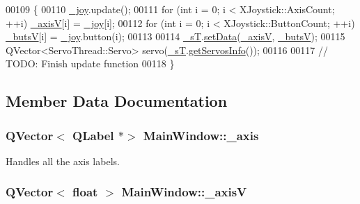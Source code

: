 \begin{DoxyCode}
00109 \{
00110     \hyperlink{a00004_a671f35800890e518713e1946671d8730}{\_joy}.update();
00111     \textcolor{keywordflow}{for} (\textcolor{keywordtype}{int} i = 0; i < XJoystick::AxisCount; ++i) \hyperlink{a00004_a20f66f574ed4c96d8dfc0013e1095f15}{\_axisV}[i] = \hyperlink{a00004_a671f35800890e518713e1946671d8730}{\_joy}[i];
00112     \textcolor{keywordflow}{for} (\textcolor{keywordtype}{int} i = 0; i < XJoystick::ButtonCount; ++i) \hyperlink{a00004_a519ae4630572cb63fbd04bce12fe8e77}{\_butsV}[i] = \hyperlink{a00004_a671f35800890e518713e1946671d8730}{\_joy}.button(i);
00113     
00114     \hyperlink{a00004_a97f8ecc7ecb930b796178cef7b975013}{\_sT}.\hyperlink{a00007_a8497ea56991b620981ce1fbf53d9ebdb}{setData}(\hyperlink{a00004_a20f66f574ed4c96d8dfc0013e1095f15}{\_axisV}, \hyperlink{a00004_a519ae4630572cb63fbd04bce12fe8e77}{\_butsV});
00115     QVector<ServoThread::Servo> servo(\hyperlink{a00004_a97f8ecc7ecb930b796178cef7b975013}{\_sT}.\hyperlink{a00007_a5fd8ef13314428f5ba7646730cc58f1c}{getServosInfo}());
00116     
00117     \textcolor{comment}{// TODO: Finish update function}
00118 \}
\end{DoxyCode}


\subsection{Member Data Documentation}
\hypertarget{a00004_a30c99d7a544f74b0650758e5cc7ead5a}{}
\subsubsection[{\+\_\+axis}]{\setlength{\rightskip}{0pt plus 5cm}Q\+Vector$<$ Q\+Label $\ast$$>$ Main\+Window\+::\+\_\+axis\hspace{0.3cm}{\ttfamily [private]}}\label{a00004_a30c99d7a544f74b0650758e5cc7ead5a}


Handles all the axis labels. 

\hypertarget{a00004_a20f66f574ed4c96d8dfc0013e1095f15}{}
\subsubsection[{\+\_\+axis\+V}]{\setlength{\rightskip}{0pt plus 5cm}Q\+Vector$<$ float $>$ Main\+Window\+::\+\_\+axis\+V\hspace{0.3cm}{\ttfamily [private]}}\label{a00004_a20f66f574ed4c96d8dfc0013e1095f15}


